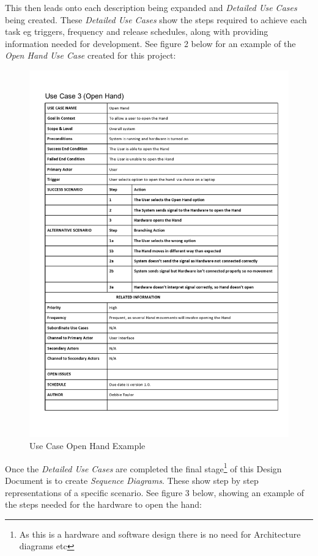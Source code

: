 \documentclass[progress]{cmpreport}
\begin{document}
This then leads onto each description being expanded and \textit{Detailed Use Cases} being created. These \textit{Detailed Use Cases} show the steps required to achieve each task eg triggers, frequency and release schedules, along with providing information needed for development. See figure 2 below for an example of the \textit{Open Hand Use Case} created for this project:
\begin{figure}[H] 
	\caption{Use Case Open Hand Example }
	\centering
	\includegraphics[width=1 \textwidth, height=0.76 \textheight]{photos/Use Case_OpenHand.jpg}
\end{figure}

Once the \textit{Detailed Use Cases} are completed the final stage\footnote{As this is a hardware and software design there is no need for Architecture diagrams etc} of this Design Document is to create \textit{Sequence Diagrams}. These show step by step representations of a specific scenario. See figure 3 below, showing an example of the steps needed for the hardware to open the hand: 
\end{document}

